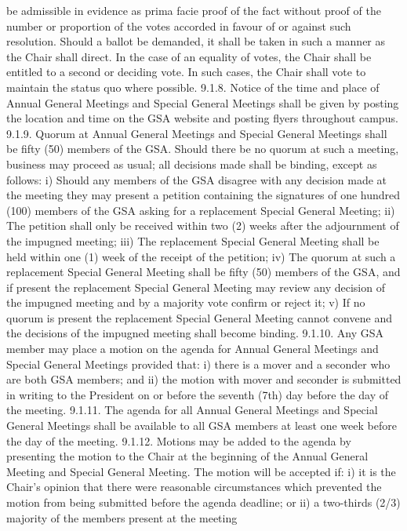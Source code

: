 \documentclass{article}
\begin{document}
be admissible in evidence as prima facie proof of the fact without 
proof of the number or proportion of the votes accorded in favour of or 
against such resolution. Should a ballot be demanded, it shall be taken 
in such a manner as the Chair shall direct. In the case of an equality of 
votes, the Chair shall be entitled to a second or deciding vote. In such 
cases, the Chair shall vote to maintain the status quo where possible. 
9.1.8. Notice of the time and place of Annual General Meetings and Special 
General Meetings shall be given by posting the location and time on 
the GSA website and posting flyers throughout campus. 
9.1.9. Quorum at Annual General Meetings and Special General Meetings 
shall be fifty (50) members of the GSA. Should there be no quorum at 
such a meeting, business may proceed as usual; all decisions made shall be binding, except as follows: 
i) Should any members of the GSA disagree with any decision made at 
the meeting they may present a petition containing the signatures of 
one hundred (100) members of the GSA asking for a replacement 
Special General Meeting; 
ii) The petition shall only be received within two (2) weeks after the 
adjournment of the impugned meeting; 
iii) The replacement Special General Meeting shall be held within one (1) 
week of the receipt of the petition; 
iv) The quorum at such a replacement Special General Meeting shall be 
fifty (50) members of the GSA, and if present the replacement Special 
General Meeting may review any decision of the impugned meeting 
and by a majority vote confirm or reject it; 
v) If no quorum is present the replacement Special General Meeting 
cannot convene and the decisions of the impugned meeting shall 
become binding. 
9.1.10. Any GSA member may place a motion on the agenda for Annual 
General Meetings and Special General Meetings provided that: 
i) there is a mover and a seconder who are both GSA members; and 
ii) the motion with mover and seconder is submitted in writing to the 
President on or before the seventh (7th) day before the day of the 
meeting. 
9.1.11. The agenda for all Annual General Meetings and Special General 
Meetings shall be available to all GSA members at least one week 
before the day of the meeting. 
9.1.12. Motions may be added to the agenda by presenting the motion to 
the Chair at the beginning of the Annual General Meeting and Special 
General Meeting. The motion will be accepted if: 
i) it is the Chair's opinion that there were reasonable circumstances 
which prevented the motion from being submitted before the agenda 
deadline; or 
ii) a two-thirds (2/3) majority of the members present at the meeting 
\end{document}
